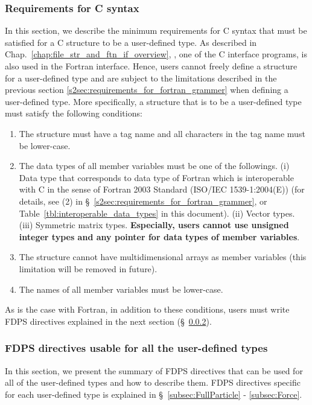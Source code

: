 \subsubsection{Requirements for C syntax}
In this section, we describe the minimum requirements for C syntax that must be satisfied for a C structure to be a user-defined type. As described in Chap.~\ref{chap:file_str_and_ftn_if_overview}, , one of the C interface programs, is also used in the Fortran interface. Hence, users cannot freely define a structure for a user-defined type and are subject to the limitations described in the previous section \ref{s2sec:requirements_for_fortran_grammer} when defining a user-defined type. More specifically, a structure that is to be a user-defined type must satisfy the following conditions:
\begin{enumerate}[leftmargin=*,itemsep=-1ex,label=(\arabic*)]
\item The structure must have a tag name and all characters in the tag name must be lower-case.
\item The data types of all member variables must be one of the followings. (i) Data type that corresponds to data type of Fortran which is interoperable with C in the sense of Fortran 2003 Standard (ISO/IEC 1539-1:2004(E)) (for details, see (2) in \S~\ref{s2sec:requirements_for_fortran_grammer}, or Table~\ref{tbl:interoperable_data_types} in this document).  (ii) Vector types. (iii) Symmetric matrix types. \textbf{Especially, users cannot use unsigned integer types and any pointer for data types of member variables}.
\item The structure cannot have multidimensional arrays as member variables (this limitation will be removed in future).
\item The names of all member variables must be lower-case.
\end{enumerate}

As is the case with Fortran, in addition to these conditions, users must write FDPS directives explained in the next section (\S~\ref{subsubsec:FDPS_directives}).

\subsubsection{FDPS directives usable for all the user-defined types}
\label{subsubsec:FDPS_directives}
In this section, we present the summary of FDPS directives that can be used for all of the user-defined types and how to describe them. FDPS directives specific for each user-defined type is explained in \S~\ref{subsec:FullParticle} - \ref{subsec:Force}.

